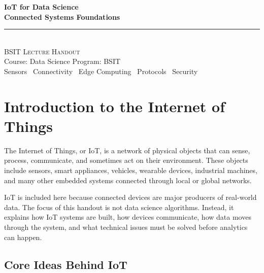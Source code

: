 \documentclass[11pt,a4paper]{article}
\begin{document}
\begin{center}
\vspace*{0.5cm}
{\Huge\bfseries\textcolor{primary}{IoT for Data Science}}\\[8pt]
{\Huge\bfseries\textcolor{primary}{Connected Systems Foundations}}\\[16pt]
{\color{secondary}\rule{0.68\textwidth}{1.5pt}}\\[12pt]
{\Large\textsc{BSIT Lecture Handout}}\\[6pt]
{\large\textcolor{gray!70!black}{Course: Data Science \quad Program: BSIT}}\\[8pt]
{\normalsize\textcolor{gray!70!black}{Sensors \textbullet\ Connectivity \textbullet\ Edge Computing \textbullet\ Protocols \textbullet\ Security}}
\vspace{0.3cm}
\end{center}

\tableofcontents
\newpage

\section{Introduction to the Internet of Things}

\begin{definitionbox}
The Internet of Things, or IoT, is a network of physical objects that can sense, process, communicate, and sometimes act on their environment. These objects include sensors, smart appliances, vehicles, wearable devices, industrial machines, and many other embedded systems connected through local or global networks.
\end{definitionbox}

\begin{conceptbox}
IoT is included here because connected devices are major producers of real-world data. The focus of this handout is not data science algorithms. Instead, it explains how IoT systems are built, how devices communicate, how data moves through the system, and what technical issues must be solved before analytics can happen.
\end{conceptbox}

\subsection{Core Ideas Behind IoT}
\end{document}

